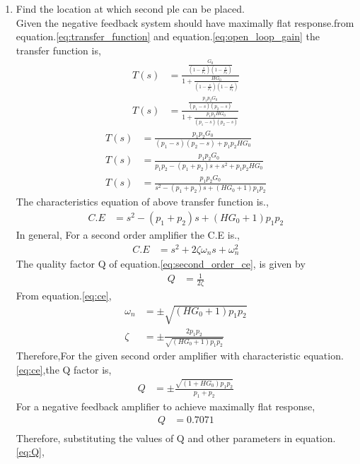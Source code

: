 \begin{enumerate}[label=\thesubsection.\arabic*.,ref=\thesubsection.\theenumi]
\item Find the location at which second ple can be placed.\\
\solution Given the negative feedback system should have maximally flat response.from equation.\ref{eq:transfer_function} and equation.\ref{eq:open_loop_gain} the transfer function is,
\begin{align}
    T(s) &= \frac{\frac{G_0}{(1-\frac{s}{p_{1}})(1-\frac{s}{p_{2}})}}{1+\frac{HG_0}{(1-\frac{s}{p_{1}})(1-\frac{s}{p_{2}})}}\\
    T(s) &= \frac{\frac{p_1p_2G_0}{(p_1-s)(p_2-s)}}{1+\frac{p_1p_2HG_0}{(p_1-s)(p_2-s)}}
\end{align}
\begin{align}
    T(s) &= \frac{p_1p_2G_0}{(p_1-s)(p_2-s) + p_1p_2HG_0}\\
    T(s) &= \frac{p_1p_2G_0}{p_1p_2-(p_1+p_2)s+s^2 + p_1p_2HG_0}\\
    T(s) &= \frac{p_1p_2G_0}{s^2-(p_1+p_2)s+(HG_0+1)p_1p_2} \label{eq:closed_loop}
\end{align}
The characteristics equation of above transfer function is.,
\begin{align}
    C.E &= s^2-(p_1+p_2)s+(HG_0+1)p_1p_2 \label{eq:ce}
\end{align}
In general, For a second order amplifier the C.E is.,
\begin{align}
    C.E &= s^2+2\zeta\omega_ns+\omega_n^{2} \label{eq:second_order_ce}
\end{align}
The quality factor Q of equation.\ref{eq:second_order_ce}, is given by
\begin{align}
    Q &= \frac{1}{2\zeta}
\end{align}
From equation.\ref{eq:ce},
\begin{align}
    \omega_n &= \pm{\sqrt{(HG_0+1)p_1p_2}}\\
    \zeta &= \pm{\frac{2p_1p_2}{\sqrt{(HG_0+1)p_1p_2}}}
\end{align}
Therefore,For the given second order amplifier with characteristic equation.\ref{eq:ce},the Q factor is,
\begin{align}
    Q &= \pm{\frac{\sqrt{(1+HG_0)p_1p_2}}{p_1+p_2}} \label{eq:Q}
\end{align}
For a negative feedback amplifier to achieve maximally flat response,
\begin{align}
    Q &= 0.7071\\
\end{align}
Therefore, substituting the values of Q and other parameters in equation.\ref{eq:Q},

\end{enumerate}
